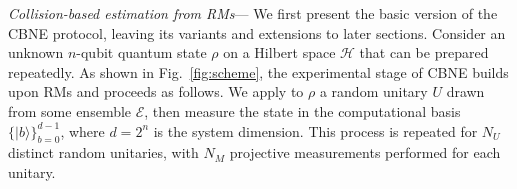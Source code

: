 \documentclass[aps,prl,twocolumn,nofootinbib,superscriptaddress,10pt]{revtex4-2}
\def\>{\rangle}
\newcommand{\red}[1]{{\leavevmode\color{red}#1}}
\newcommand{\zy}[1]{\textcolor{red}{(ZY: #1)}}
\theoremstyle{plain}
\theoremstyle{definition}
\newcommand{\caH}{\mathcal{H}}
\begin{document}
\emph{Collision-based estimation from RMs}---
We first present the basic version of the CBNE protocol, leaving its variants and extensions to later sections.
Consider an unknown $n$-qubit quantum state $\rho$ on a Hilbert space $\caH$ that can be prepared repeatedly. As shown in Fig.~\ref{fig:scheme}, the experimental stage of CBNE builds upon RMs \cite{elben2023randomized} and proceeds as follows.
We apply to $\rho$ a random unitary $U$ drawn from some ensemble $\mathcal E$, then measure the state in the computational basis $\{|b\>\}_{b=0}^{d-1}$,  where $d=2^n$ is the system dimension. 
This process is repeated for $N_U$ distinct random unitaries, with $N_M$ projective measurements performed for each unitary.

\end{document}
